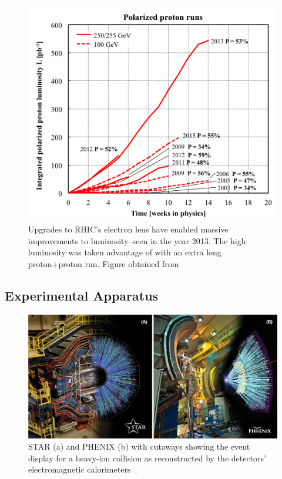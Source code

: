 \begin{figure}[ht]
  \centering
  \includegraphics[width=0.8\linewidth]{./figures/RhicLuminosityPP.png}
  \caption{
    Upgrades to RHIC's electron lens have enabled massive improvements to
    luminosity--seen in the year 2013. The high luminosity was taken advantage
    of with an extra long proton+proton run. Figure obtained from
     \cite{Fischer2016}
  }
  \label{fig:rhic_luminosity}
\end{figure}


\clearpage
\subsection{Experimental Apparatus}

\begin{figure}[ht]
  \centering
  \includegraphics[width=\linewidth]{./figures/rhic_graphics_fig2-hr.jpg}
  \caption{
    STAR (a) and PHENIX (b) with cutaways showing the event display for a
    heavy-ion collision as reconstructed by the detectors' electromagnetic
    calorimeters~\cite{Walsh2012}.
  }
  \label{fig:phenix_and_star}
\end{figure}

